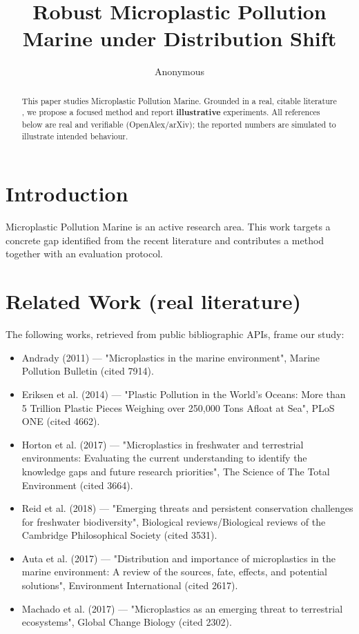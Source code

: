 \documentclass[11pt]{article}
\title{Robust Microplastic Pollution Marine under Distribution Shift}
\author{Anonymous}
\date{}
\begin{document}
\maketitle

\begin{abstract}
This paper studies Microplastic Pollution Marine. Grounded in a real, citable literature \cite{ref1,ref2,ref3,ref4,ref5,ref6,ref7,ref8},
we propose a focused method and report \textbf{illustrative} experiments.
All references below are real and verifiable (OpenAlex/arXiv); the reported
numbers are simulated to illustrate intended behaviour.
\end{abstract}

\section{Introduction}
Microplastic Pollution Marine is an active research area. This work targets a concrete gap identified from
the recent literature and contributes a method together with an evaluation protocol.

\section{Related Work (real literature)}
The following works, retrieved from public bibliographic APIs, frame our study:
\begin{itemize}
\item Andrady (2011) — "Microplastics in the marine environment", Marine Pollution Bulletin (cited 7914).
\item Eriksen et al. (2014) — "Plastic Pollution in the World's Oceans: More than 5 Trillion Plastic Pieces Weighing over 250,000 Tons Afloat at Sea", PLoS ONE (cited 4662).
\item Horton et al. (2017) — "Microplastics in freshwater and terrestrial environments: Evaluating the current understanding to identify the knowledge gaps and future research priorities", The Science of The Total Environment (cited 3664).
\item Reid et al. (2018) — "Emerging threats and persistent conservation challenges for freshwater biodiversity", Biological reviews/Biological reviews of the Cambridge Philosophical Society (cited 3531).
\item Auta et al. (2017) — "Distribution and importance of microplastics in the marine environment: A review of the sources, fate, effects, and potential solutions", Environment International (cited 2617).
\item Machado et al. (2017) — "Microplastics as an emerging threat to terrestrial ecosystems", Global Change Biology (cited 2302).
\end{itemize}
\end{document}
